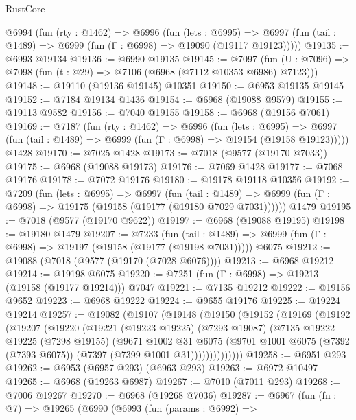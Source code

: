 \begin{lexlean}{RustCore}
\begin{coremodule}
  @6994
    (fun (rty : @1462) =>
    @6996
      (fun (lets : @6995) =>
      @6997 (fun (tail : @1489) => @6999 (fun (Γ : @6998) => @19090 (@19117 @19123)))))
@19135 := @6993 @19134
@19136 := @6990 @19135
@19145 := @7097
    (fun (U : @7096) => @7098 (fun (t : @29) => @7106 (@6968 (@7112 @10353 @6986) @7123)))
@19148 := @19110 (@19136 @19145) @10351
@19150 := @6953 @19135 @19145
@19152 := @7184 @19134 @1436
@19154 := @6968 (@19088 @9579)
@19155 := @19113 @9582
@19156 := @7040 @19155
@19158 := @6968 (@19156 @7061)
@19169 := @7187
    (fun (rty : @1462) =>
    @6996
      (fun (lets : @6995) =>
      @6997 (fun (tail : @1489) => @6999 (fun (Γ : @6998) => @19154 (@19158 @19123)))))
    @1428
@19170 := @7025 @1428
@19173 := @7018 (@9577 (@19170 @7033))
@19175 := @6968 (@19088 @19173)
@19176 := @7069 @1428
@19177 := @7068 @19176
@19178 := @7072 @19176
@19180 := @19178 @19118 @10356
@19192 := @7209
    (fun (lets : @6995) =>
    @6997
      (fun (tail : @1489) =>
      @6999 (fun (Γ : @6998) => @19175 (@19158 (@19177 (@19180 @7029 @7031))))))
    @1479
@19195 := @7018 (@9577 (@19170 @9622))
@19197 := @6968 (@19088 @19195)
@19198 := @19180 @1479
@19207 := @7233
    (fun (tail : @1489) => @6999 (fun (Γ : @6998) => @19197 (@19158 (@19177 (@19198 @7031)))))
    @6075
@19212 := @19088 (@7018 (@9577 (@19170 (@7028 @6076))))
@19213 := @6968 @19212
@19214 := @19198 @6075
@19220 := @7251 (fun (Γ : @6998) => @19213 (@19158 (@19177 @19214))) @7047
@19221 := @7135 @19212
@19222 := @19156 @9652
@19223 := @6968 @19222
@19224 := @9655 @19176
@19225 := @19224 @19214
@19257 := @19082
    (@19107
      (@19148
        (@19150
          (@19152
            (@19169
              (@19192
                (@19207
                  (@19220
                    (@19221
                      (@19223 @19225)
                      (@7293 @19087)
                      (@7135
                        @19222
                        @19225
                        (@7298 @19155)
                        (@9671
                          @1002
                          @31
                          @6075
                          (@9701
                            @1001
                            @6075
                            (@7392 (@7393 @6075))
                            (@7397 (@7399 @1001 @31))))))))))))))
@19258 := @6951 @293
@19262 := @6953 (@6957 @293) (@6963 @293)
@19263 := @6972 @10497
@19265 := @6968 (@19263 @6987)
@19267 := @7010 (@7011 @293)
@19268 := @7006 @19267
@19270 := @6968 (@19268 @7036)
@19287 := @6967
    (fun (fn : @7) =>
    @19265
      (@6990
        (@6993
          (fun (params : @6992) =>

\end{coremodule}
\end{lexlean}
